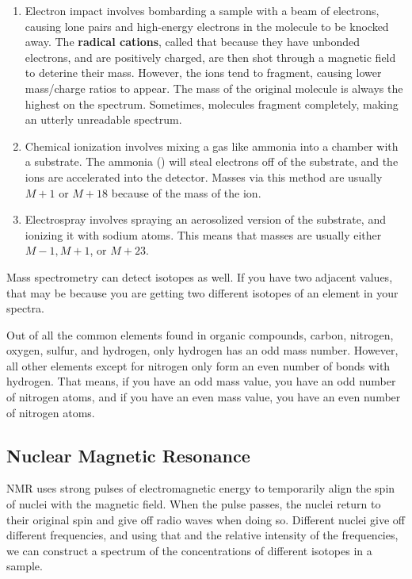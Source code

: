 \documentclass{article}
\begin{document}
\begin{enumerate}
    \item Electron impact involves bombarding a sample with a beam of electrons, causing lone pairs and high-energy electrons in the molecule to be knocked away. The \textbf{radical cations}, called that because they have unbonded electrons, and are positively charged, are then shot through a magnetic field to deterine their mass. However, the ions tend to fragment, causing lower mass/charge ratios to appear. The mass of the original molecule is always the highest on the spectrum. Sometimes, molecules fragment completely, making an utterly unreadable spectrum.
    \item Chemical ionization involves mixing a gas like ammonia into a chamber with a substrate. The ammonia () will steal electrons off of the substrate, and the ions are accelerated into the detector. Masses via this method are usually $M+1$ or $M+18$ because of the mass of the  ion. 
    \item Electrospray involves spraying an aerosolized version of the substrate, and ionizing it with sodium atoms. This means that masses are usually either $M-1, M+1$, or $M+23$. 
\end{enumerate}

Mass spectrometry can detect isotopes as well. If you have two adjacent values, that may be because you are getting two different isotopes of an element in your spectra.

Out of all the common elements found in organic compounds, carbon, nitrogen, oxygen, sulfur, and hydrogen, only hydrogen has an odd mass number. However, all other elements except for nitrogen only form an even number of bonds with hydrogen. That means, if you have an odd mass value, you have an odd number of nitrogen atoms, and if you have an even mass value, you have an even number of nitrogen atoms. 

\subsection{Nuclear Magnetic Resonance}

NMR uses strong pulses of electromagnetic energy to temporarily align the spin of nuclei with the magnetic field. When the pulse passes, the nuclei return to their original spin and give off radio waves when doing so. Different nuclei give off different frequencies, and using that and the relative intensity of the frequencies, we can construct a spectrum of the concentrations of different isotopes in a sample. 
\end{document}
